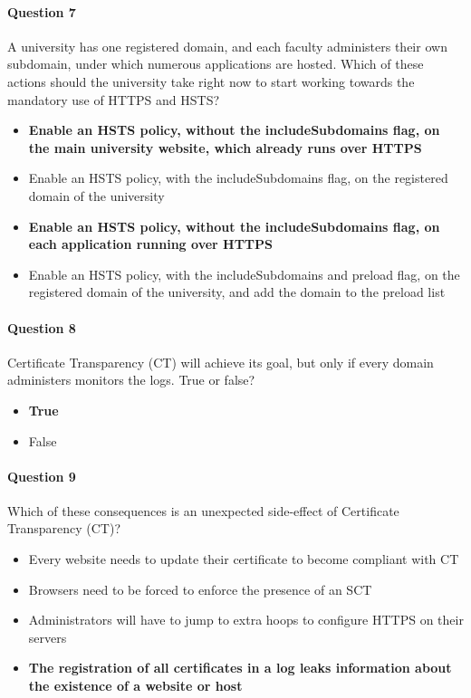 \documentclass[titlepage]{article}
\begin{document}
    \paragraph{Question 7} A university has one registered domain, and each faculty administers their own subdomain, under which numerous applications are hosted. Which of these actions should the university take right now to start working towards the mandatory use of HTTPS and HSTS?
    \begin{itemize}
        \item \textbf{Enable an HSTS policy, without the includeSubdomains flag, on the main university website, which already runs over HTTPS} \checkmark
        \item Enable an HSTS policy, with the includeSubdomains flag, on the registered domain of the university
        \item \textbf{Enable an HSTS policy, without the includeSubdomains flag, on each application running over HTTPS} \checkmark
        \item Enable an HSTS policy, with the includeSubdomains and preload flag, on the registered domain of the university, and add the domain to the preload list
    \end{itemize}
    \paragraph{Question 8} Certificate Transparency (CT) will achieve its goal, but only if every domain administers monitors the logs. True or false?
    \begin{itemize}
        \item \textbf{True} \checkmark
        \item False
    \end{itemize}
    \paragraph{Question 9} Which of these consequences is an unexpected side-effect of Certificate Transparency (CT)?
    \begin{itemize}
        \item Every website needs to update their certificate to become compliant with CT
        \item Browsers need to be forced to enforce the presence of an SCT
        \item Administrators will have to jump to extra hoops to configure HTTPS on their servers
        \item \textbf{The registration of all certificates in a log leaks information about the existence of a website or host} \checkmark
    \end{itemize}
\end{document}
